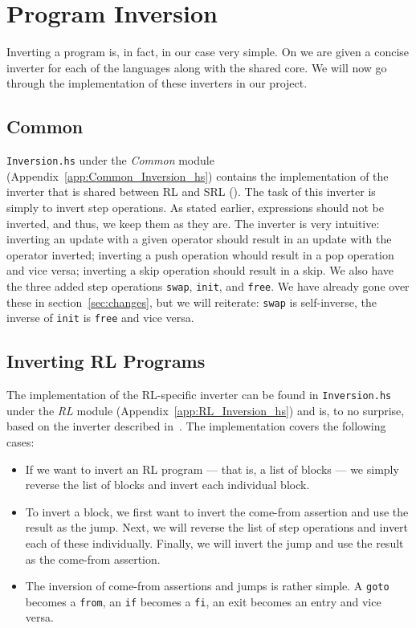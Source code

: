 \section{Program Inversion}

Inverting a program is, in fact, in our case very simple. On \cite[p.~104]{REV} we are given a concise inverter for each of the languages along with the shared core. We will now go through the implementation of these inverters in our project.

\subsection{Common}
\label{sec:invcommon}

\texttt{Inversion.hs} under the \textit{Common} module (Appendix~\ref{app:Common_Inversion_hs}) contains the implementation of the inverter that is shared between RL and SRL (\cite[Fig.~20]{REV}). The task of this inverter is simply to invert step operations. As stated earlier, expressions should not be inverted, and thus, we keep them as they are. The inverter is very intuitive: inverting an update with a given operator should result in an update with the operator inverted; inverting a push operation whould result in a pop operation and vice versa; inverting a skip operation should result in a skip. We also have the three added step operations \texttt{swap}, \texttt{init}, and \texttt{free}. We have already gone over these in section~\ref{sec:changes}, but we will reiterate: \texttt{swap} is self-inverse, the inverse of \texttt{init} is \texttt{free} and vice versa.

\subsection{Inverting RL Programs}

The implementation of the RL-specific inverter can be found in \texttt{Inversion.hs} under the \textit{RL} module (Appendix~\ref{app:RL_Inversion_hs}) and is, to no surprise, based on the inverter described in~\cite[Fig.~19]{REV}. The implementation covers the following cases:
\begin{itemize}
  \item If we want to invert an RL program --- that is, a list of blocks --- we simply reverse the list of blocks and invert each individual block.

  \item To invert a block, we first want to invert the come-from assertion and use the result as the jump. Next, we will reverse the list of step operations and invert each of these individually. Finally, we will invert the jump and use the result as the come-from assertion.

  \item The inversion of come-from assertions and jumps is rather simple. A \texttt{goto} becomes a \texttt{from}, an \texttt{if} becomes a \texttt{fi}, an exit becomes an entry and vice versa.
\end{itemize}

